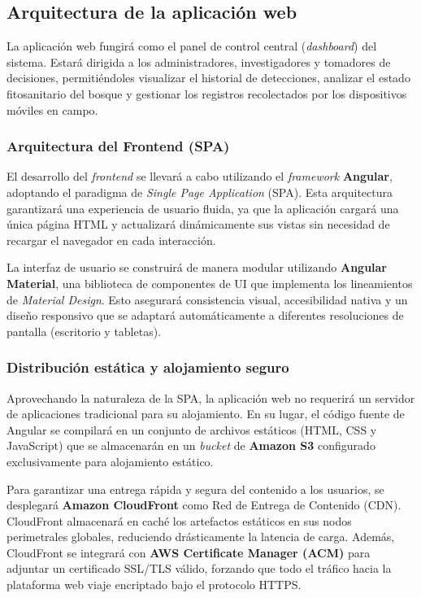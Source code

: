 \newpage
\subsection{Arquitectura de la aplicación web}

La aplicación web fungirá como el panel de control central (\textit{dashboard}) del sistema. Estará dirigida a los administradores, investigadores y tomadores de decisiones, permitiéndoles visualizar el historial de detecciones, analizar el estado fitosanitario del bosque y gestionar los registros recolectados por los dispositivos móviles en campo.

\subsubsection{Arquitectura del Frontend (SPA)}

El desarrollo del \textit{frontend} se llevará a cabo utilizando el \textit{framework} \textbf{Angular}, adoptando el paradigma de \textit{Single Page Application} (SPA). Esta arquitectura garantizará una experiencia de usuario fluida, ya que la aplicación cargará una única página HTML y actualizará dinámicamente sus vistas sin necesidad de recargar el navegador en cada interacción.

La interfaz de usuario se construirá de manera modular utilizando \textbf{Angular Material}, una biblioteca de componentes de UI que implementa los lineamientos de \textit{Material Design}. Esto asegurará consistencia visual, accesibilidad nativa y un diseño responsivo que se adaptará automáticamente a diferentes resoluciones de pantalla (escritorio y tabletas). 

\subsubsection{Distribución estática y alojamiento seguro}

Aprovechando la naturaleza de la SPA, la aplicación web no requerirá un servidor de aplicaciones tradicional para su alojamiento. En su lugar, el código fuente de Angular se compilará en un conjunto de archivos estáticos (HTML, CSS y JavaScript) que se almacenarán en un \textit{bucket} de \textbf{Amazon S3} configurado exclusivamente para alojamiento estático.

Para garantizar una entrega rápida y segura del contenido a los usuarios, se desplegará \textbf{Amazon CloudFront} como Red de Entrega de Contenido (CDN). CloudFront almacenará en caché los artefactos estáticos en sus nodos perimetrales globales, reduciendo drásticamente la latencia de carga. Además, CloudFront se integrará con \textbf{AWS Certificate Manager (ACM)} para adjuntar un certificado SSL/TLS válido, forzando que todo el tráfico hacia la plataforma web viaje encriptado bajo el protocolo HTTPS.

